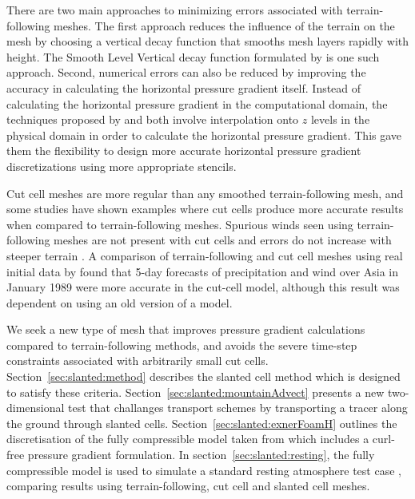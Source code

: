 There are two main approaches to minimizing errors associated with terrain-following meshes.
The first approach reduces the influence of the terrain on the mesh by choosing a vertical decay function that smooths mesh layers rapidly with height.  The Smooth Level Vertical decay function formulated by \citet{schaer2002} is one such approach.
Second, numerical errors can also be reduced by improving the accuracy in calculating the horizontal pressure gradient itself.  Instead of calculating the horizontal pressure gradient in the computational domain, the techniques proposed by \citet{klemp2011} and \citet{zaengl2012} both involve interpolation onto $z$ levels in the physical domain in order to calculate the horizontal pressure gradient.  This gave them the flexibility to design more accurate horizontal pressure gradient discretizations using more appropriate stencils.

Cut cell meshes are more regular than any smoothed terrain-following mesh, and some studies have shown examples where cut cells produce more accurate results when compared to terrain-following meshes.
Spurious winds seen using terrain-following meshes are not present with cut cells and errors do not increase with steeper terrain \citep{good2014}.
A comparison of terrain-following and cut cell meshes using real initial data by \citet{steppeler2013} found that 5-day forecasts of precipitation and wind over Asia in January 1989 were more accurate in the cut-cell model, although this result was dependent on using an old version of a model.

We seek a new type of mesh that improves pressure gradient calculations compared to terrain-following methods, and avoids the severe time-step constraints associated with arbitrarily small cut cells.  Section~\ref{sec:slanted:method} describes the slanted cell method which is designed to satisfy these criteria.
Section~\ref{sec:slanted:mountainAdvect} presents a new two-dimensional test that challanges transport schemes by transporting a tracer along the ground through slanted cells.
Section~\ref{sec:slanted:exnerFoamH} outlines the discretisation of the fully compressible model taken from \citet{weller-shahrokhi2014} which includes a curl-free pressure gradient formulation.  In section~\ref{sec:slanted:resting}, the fully compressible model is used to simulate a standard resting atmosphere test case \citep{klemp2011}, comparing results using terrain-following, cut cell and slanted cell meshes.





